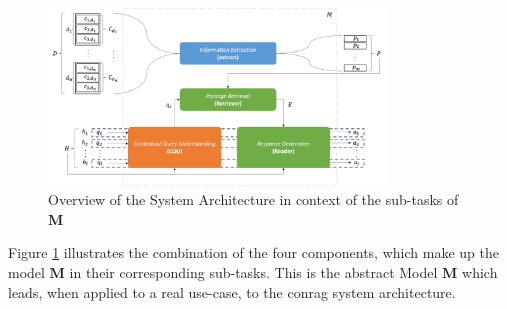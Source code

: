 \begin{figure}
    \centering
    \includegraphics[width=0.8\textwidth]{Grafiken/conrag_konzeptionell.png}
    \caption{Overview of the System Architecture in context of the sub-tasks of $\mathbf{M}$}
    \label{fig:conrag_concept_system_architecture}
\end{figure}

Figure \ref{fig:conrag_concept_system_architecture} illustrates the combination of the four components, which make up the model $\mathbf{M}$ in their corresponding sub-tasks. This is the abstract Model $\mathbf{M}$ which leads, when applied to a real use-case, to the \gls{conrag} system architecture.



